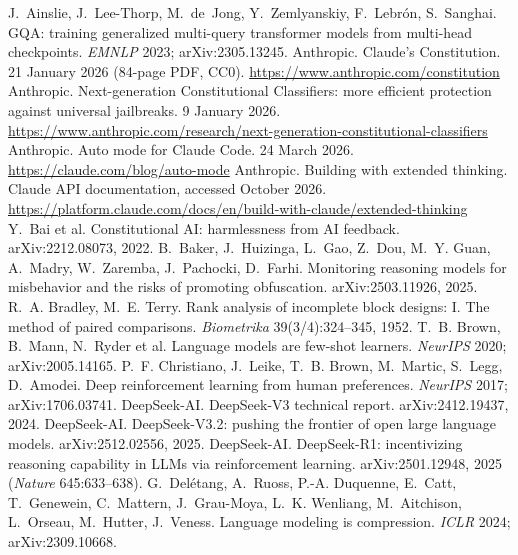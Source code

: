  J.~Ainslie, J.~Lee-Thorp, M.~de~Jong, Y.~Zemlyanskiy, F.~Lebr{\'o}n, S.~Sanghai. GQA: training generalized multi-query transformer models from multi-head checkpoints. \emph{EMNLP} 2023; arXiv:2305.13245.
 Anthropic. Claude's Constitution. 21 January 2026 (84-page PDF, CC0). \url{https://www.anthropic.com/constitution}
 Anthropic. Next-generation Constitutional Classifiers: more efficient protection against universal jailbreaks. 9 January 2026. \url{https://www.anthropic.com/research/next-generation-constitutional-classifiers}
 Anthropic. Auto mode for Claude Code. 24 March 2026. \url{https://claude.com/blog/auto-mode}
 Anthropic. Building with extended thinking. Claude API documentation, accessed October 2026. \url{https://platform.claude.com/docs/en/build-with-claude/extended-thinking}
 Y.~Bai et al. Constitutional AI: harmlessness from AI feedback. arXiv:2212.08073, 2022.
 B.~Baker, J.~Huizinga, L.~Gao, Z.~Dou, M.~Y. Guan, A.~Madry, W.~Zaremba, J.~Pachocki, D.~Farhi. Monitoring reasoning models for misbehavior and the risks of promoting obfuscation. arXiv:2503.11926, 2025.
 R.~A. Bradley, M.~E. Terry. Rank analysis of incomplete block designs: I. The method of paired comparisons. \emph{Biometrika} 39(3/4):324--345, 1952.
 T.~B. Brown, B.~Mann, N.~Ryder et al. Language models are few-shot learners. \emph{NeurIPS} 2020; arXiv:2005.14165.
 P.~F. Christiano, J.~Leike, T.~B. Brown, M.~Martic, S.~Legg, D.~Amodei. Deep reinforcement learning from human preferences. \emph{NeurIPS} 2017; arXiv:1706.03741.
 DeepSeek-AI. DeepSeek-V3 technical report. arXiv:2412.19437, 2024.
 DeepSeek-AI. DeepSeek-V3.2: pushing the frontier of open large language models. arXiv:2512.02556, 2025.
 DeepSeek-AI. DeepSeek-R1: incentivizing reasoning capability in LLMs via reinforcement learning. arXiv:2501.12948, 2025 (\emph{Nature} 645:633--638).
 G.~Del{\'e}tang, A.~Ruoss, P.-A. Duquenne, E.~Catt, T.~Genewein, C.~Mattern, J.~Grau-Moya, L.~K. Wenliang, M.~Aitchison, L.~Orseau, M.~Hutter, J.~Veness. Language modeling is compression. \emph{ICLR} 2024; arXiv:2309.10668.
